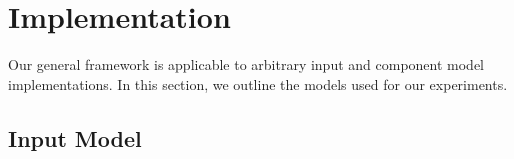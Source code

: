 \documentclass[letterpaper]{article}
\begin{document}


\section{Implementation}
\label{sec:implementation}

Our general framework is applicable to arbitrary input and component model implementations.
In this section, we outline the models used for our experiments.

\subsection{Input Model}
\end{document}
